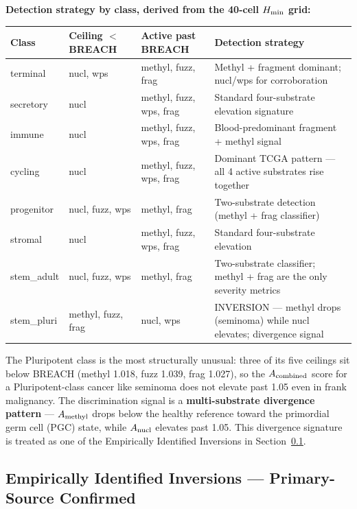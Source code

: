 \documentclass[12pt,a4paper]{article}
\begin{document}
\textbf{Detection strategy by class, derived from the 40-cell $H_{\rm min}$ grid:}

\begin{center}
\renewcommand{\arraystretch}{1.2}
\footnotesize
\begin{tabular}{lllp{4.5cm}}
\toprule
\textbf{Class} & \textbf{Ceiling $<$ BREACH} & \textbf{Active past BREACH}
& \textbf{Detection strategy} \\
\midrule
terminal    & nucl, wps          & methyl, fuzz, frag & Methyl + fragment dominant; nucl/wps for corroboration \\
secretory   & nucl               & methyl, fuzz, wps, frag & Standard four-substrate elevation signature \\
immune      & nucl               & methyl, fuzz, wps, frag & Blood-predominant fragment + methyl signal \\
cycling     & nucl               & methyl, fuzz, wps, frag & Dominant TCGA pattern --- all 4 active substrates rise together \\
progenitor  & nucl, fuzz, wps    & methyl, frag       & Two-substrate detection (methyl + frag classifier) \\
stromal     & nucl               & methyl, fuzz, wps, frag & Standard four-substrate elevation \\
stem\_adult  & nucl, fuzz, wps    & methyl, frag       & Two-substrate classifier; methyl + frag are the only severity metrics \\
stem\_pluri  & methyl, fuzz, frag & nucl, wps          & INVERSION --- methyl drops (seminoma) while nucl elevates; divergence signal \\
\bottomrule
\end{tabular}
\end{center}

\noindent The Pluripotent class is the most structurally unusual: three of its
five ceilings sit below BREACH (methyl 1.018, fuzz 1.039, frag 1.027), so the
$A_{\rm combined}$ score for a Pluripotent-class cancer like seminoma does not
elevate past 1.05 even in frank malignancy. The discrimination signal is a
\textbf{multi-substrate divergence pattern} --- $A_{\rm methyl}$ drops below
the healthy reference toward the primordial germ cell (PGC) state, while
$A_{\rm nucl}$ elevates past 1.05. This divergence signature is treated as
one of the Empirically Identified Inversions in
Section~\ref{subsec:identified_inversions}.

\subsection{Empirically Identified Inversions --- Primary-Source Confirmed}
\label{subsec:identified_inversions}
\end{document}

